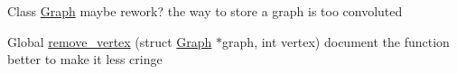 
\begin{DoxyRefList}
\item[Class \mbox{\hyperlink{structGraph}{Graph}} ]\label{todo__todo000001}%
%
maybe rework? the way to store a graph is too convoluted  
\item[Global \mbox{\hyperlink{graphs_8h_a5be0e3005b2f6b61fd9b802ddbfe7305}{remove\+\_\+vertex}} (struct \mbox{\hyperlink{structGraph}{Graph}} $\ast$graph, int vertex)]\label{todo__todo000002}%
%
document the function better to make it less cringe 
\end{DoxyRefList}